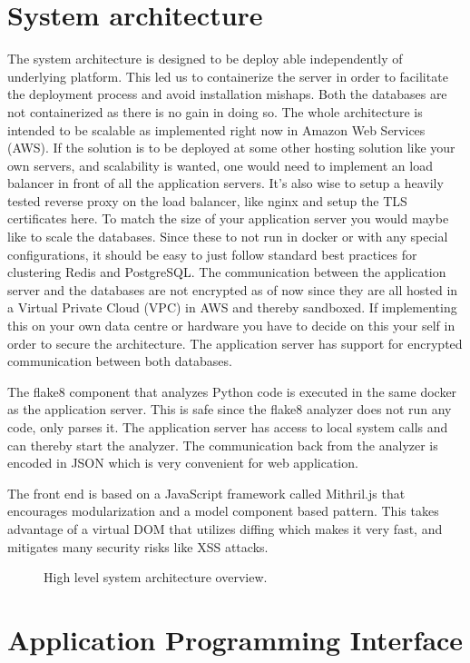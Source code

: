 \documentclass[12pt,a4paper]{report}
\begin{document}
\chapter{System architecture}
The system architecture is designed to be deploy able independently of underlying platform. This led us to containerize the server in order to facilitate the deployment process and avoid installation mishaps. Both the databases are not containerized as there is no gain in doing so.
The whole architecture is intended to be scalable as implemented right now in Amazon Web Services (AWS). If the solution is to be deployed at some other hosting solution like your own servers, and scalability is wanted, one would need to implement an load balancer in front of all the application servers. It's also wise to setup a heavily tested reverse proxy on the load balancer, like nginx and setup the TLS certificates here. To match the size of your application server you would maybe like to scale the databases. Since these to not run in docker or with any special configurations, it should be easy to just follow standard best practices for clustering Redis and PostgreSQL.
The communication between the application server and the databases are not encrypted as of now since they are all hosted in a Virtual Private Cloud (VPC) in AWS and thereby sandboxed. If implementing this on your own data centre or hardware you have to decide on this your self in order to secure the architecture. The application server has support for encrypted communication between both databases. 

The flake8 component that analyzes Python code is executed in the same docker as the application server. This is safe since the flake8 analyzer does not run any code, only parses it.
The application server has access to local system calls and can thereby start the analyzer. The communication back from the analyzer is encoded in JSON which is very convenient for web application.

The front end is based on a JavaScript framework called Mithril.js that encourages modularization and a model component based pattern. This takes advantage of a virtual DOM that utilizes diffing which makes it very fast, and mitigates many security risks like XSS attacks. 

\begin{figure}[H]
  \centering
  
  \caption{High level system architecture overview.}
\end{figure}
\chapter{Application Programming Interface}
\end{document}
